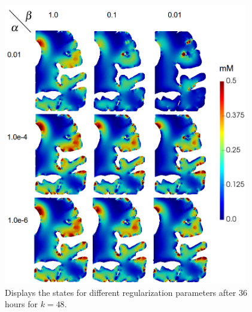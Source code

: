\documentclass[11pt,a4paper]{article}
\begin{document}
\begin{figure}
\centering
\includegraphics[width=0.95\textwidth]{Statecomparison36h-pinta.png} 
\caption{ Displays the states for different regularization parameters after 36 hours for $k=48$.}
\label{statecomparison}
\end{figure}

 
\end{document}
